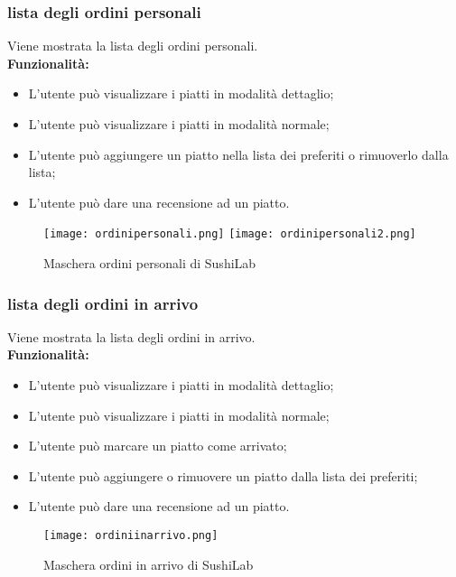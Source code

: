 \subsubsection{lista degli ordini personali}
Viene mostrata la lista degli ordini personali.\\
\textbf{Funzionalità:}
\begin{itemize}
    \item L'utente può visualizzare i piatti in modalità dettaglio;
    \item L'utente può visualizzare i piatti in modalità normale;
    \item L'utente può aggiungere un piatto nella lista dei preferiti o rimuoverlo dalla lista;
    \item L'utente può dare una recensione ad un piatto.
\end{itemize}
\begin{figure}[H]
    \centering
    \texttt{[image: ordinipersonali.png]}
    \texttt{[image: ordinipersonali2.png]}
    \caption{Maschera ordini personali di SushiLab}
\end{figure}
\pagebreak

\subsubsection{lista degli ordini in arrivo}
Viene mostrata la lista degli ordini in arrivo.\\
\textbf{Funzionalità:}
\begin{itemize}
    \item L'utente può visualizzare i piatti in modalità dettaglio;
    \item L'utente può visualizzare i piatti in modalità normale;
    \item L'utente può marcare un piatto come arrivato;
    \item L'utente può aggiungere o rimuovere un piatto dalla lista dei preferiti;
    \item L'utente può dare una recensione ad un piatto.
\end{itemize}
\begin{figure}[H]
    \centering
    \texttt{[image: ordiniinarrivo.png]}
    \caption{Maschera ordini in arrivo di SushiLab}
\end{figure}
\pagebreak

